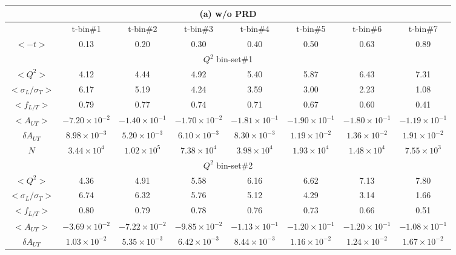 	\begin{table}[!ht]
	\centering
	  \small
	\begin{tabular}{|c|c|c|c|c|c|c|c|}
	 \multicolumn{8}{c}{ (a) w/o PRD} \\
	  \hline
	      &  t-bin\#1 & t-bin\#2 & t-bin\#3 & t-bin\#4 & t-bin\#5 & t-bin\#6 & t-bin\#7 \\
	\hline 
	    $<-t>$                &  0.13 & 0.20   & 0.30   & 0.40   & 0.50   & 0.63   & 0.89  \\
	      \hline
   	  \multicolumn{8}{|c|}{$Q^{2}$ bin-set\#1 } \\
   	    \hline
   	   $<Q^{2}>$          & 4.12  & 4.44   & 4.92   & 5.40   & 5.87   & 6.43  & 7.31  \\
   	   $<\sigma_{L}/\sigma_{T}>$ & 6.17 & 5.19 & 4.24 & 3.59 & 3.00 & 2.23 & 1.08 \\
   	   $<f_{L/T}>$        & 0.79 & 0.77 & 0.74 & 0.71 & 0.67 & 0.60 & 0.41 \\
	   $<A_{UT}>$        &$-7.20\times 10^{-2}$   & $-1.40\times 10^{-1}$   & $-1.70\times 10^{-2}$    & $-1.81\times 10^{-1}$    & $-1.90\times 10^{-1}$    & $-1.80\times 10^{-1}$   & $-1.19\times 10^{-1}$   \\
	   $\delta A_{UT}$  &  $8.98\times 10^{-3}$   & $5.20\times 10^{-3}$    &   $6.10\times 10^{-3}$  &  $8.30\times 10^{-3}$    &  $1.19\times 10^{-2}$   &   $1.36\times 10^{-2}$ &   $1.91\times 10^{-2}$ \\
	   $N$                     & $3.44\times 10^{4}$   &$1.02\times 10^{5}$   & $7.38\times 10^{4}$   &  $3.98\times 10^{4}$  & $1.93\times 10^{4}$  &  $1.48\times 10^{4}$ &$7.55\times 10^{3}$  \\
  \hline
   	  \multicolumn{8}{|c|}{$Q^{2}$ bin-set\#2 } \\
  \hline 
   	   $<Q^{2}>$          & 4.36  & 4.91   & 5.58   & 6.16   & 6.62   & 7.13  & 7.80  \\
	   $<\sigma_{L}/\sigma_{T}>$ & 6.74 & 6.32 & 5.76 & 5.12 & 4.29 & 3.14 & 1.66 \\
   	   $<f_{L/T}>$        & 0.80 & 0.79 & 0.78 & 0.76 & 0.73 & 0.66 & 0.51 \\
	   $<A_{UT}>$        &$-3.69\times 10^{-2}$   & $-7.22\times 10^{-2}$   & $-9.85\times 10^{-2}$    & $-1.13\times 10^{-1}$    & $-1.20\times 10^{-1}$    & $-1.20\times 10^{-1}$   & $-1.08\times 10^{-1}$   \\
	   $\delta A_{UT}$  &  $1.03\times 10^{-2}$   & $5.35\times 10^{-3}$    &   $6.42\times 10^{-3}$  &  $8.44\times 10^{-3}$   &  $1.16\times 10^{-2}$   &   $1.24\times 10^{-2}$ &   $1.67\times 10^{-2}$ \\

\end{tabular}
\end{table}
